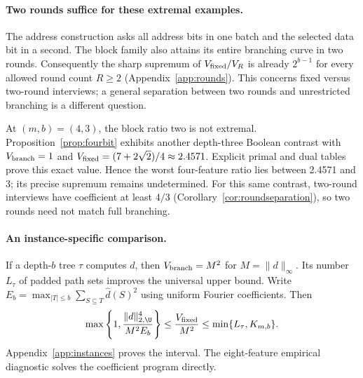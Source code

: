 \paragraph{Two rounds suffice for these extremal examples.}
The address construction asks all address bits in one batch and the selected data bit in a second. The block family also attains its entire branching curve in two rounds. Consequently the sharp supremum of $V_{\rm fixed}/V_R$ is already $2^{b-1}$ for every allowed round count $R\ge2$ (Appendix~\ref{app:rounds}). This concerns fixed versus two-round interviews; a general separation between two rounds and unrestricted branching is a different question.

At $(m,b)=(4,3)$, the block ratio two is not extremal. Proposition~\ref{prop:fourbit} exhibits another depth-three Boolean contrast with $V_{\rm branch}=1$ and $V_{\rm fixed}=(7+2\sqrt2)/4\approx2.4571$. Explicit primal and dual tables prove this exact value. Hence the worst four-feature ratio lies between 2.4571 and 3; its precise supremum remains undetermined. For this same contrast, two-round interviews have coefficient at least $4/3$ (Corollary~\ref{cor:roundseparation}), so two rounds need not match full branching.

\paragraph{An instance-specific comparison.}
If a depth-$b$ tree $\tau$ computes $d$, then $V_{\rm branch}=M^2$ for $M=\|d\|_\infty$. Its number $L_\tau$ of padded path sets improves the universal upper bound. Write $E_b=\max_{|T|\le b}\sum_{S\subseteq T}\widehat d(S)^2$ using uniform Fourier coefficients. Then
\[
 \max\left\{1,\frac{\|d\|_{2,\U}^4}{M^2 E_b}\right\}
 \le\frac{V_{\rm fixed}}{M^2}\le\min\{L_\tau,K_{m,b}\}.
\]
Appendix~\ref{app:instances} proves the interval. The eight-feature empirical diagnostic solves the coefficient program directly.

